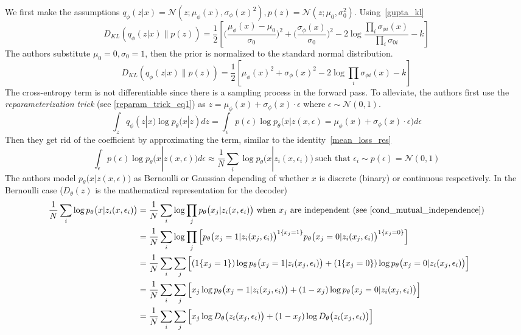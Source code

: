 \documentclass{book}
\numberwithin{equation}{subsection}
\begin{document}
We first make the assumptions $q_\phi(z|x)=\mathcal{N}(z;\mu_\phi(x),\sigma_\phi(x)^2), p(z)=\mathcal{N}(z;\mu_0,\sigma_0^2)$. Using~\ref{gupta_kl}
\begin{equation}
    D_{KL}(q_\phi(z|x) \parallel p(z)) = \frac{1}{2}\left[\Big(\frac{\mu_\phi(x)-\mu_0}{\sigma_0}\Big)^2+\Big(\frac{\sigma_\phi(x)}{\sigma_0}\Big)^2-2\log\frac{\prod_i\sigma_{\phi i}(x)}{\prod_i\sigma_{0i}} - k\right]
\end{equation}
The authors substitute $\mu_0=0,\sigma_0=1$, then the prior is normalized to the standard normal distribution.
\begin{equation}
    D_{KL}(q_\phi(z|x) \parallel p(z)) = \frac{1}{2}\left[\mu_\phi(x)^2+\sigma_\phi(x)^2-2\log\prod_i\sigma_{\phi i}(x) - k\right]
\end{equation}
The cross-entropy term is not differentiable since there is a sampling process in the forward pass. To alleviate, the authors first use the \textit{reparameterization trick} (see \ref{reparam_trick_eq1}) as $z = \mu_\phi(x)+\sigma_\phi(x) \cdot \epsilon$ where $\epsilon \sim \mathcal{N}(0,1)$.
\begin{equation}
    \int_z q_\phi(z|x)\log p_\theta(x|z)dz = \int_\epsilon p(\epsilon)\log p_\theta \big(x|z(x, \epsilon) = \mu_\phi(x)+\sigma_\phi(x) \cdot \epsilon \big)d\epsilon
\end{equation}
Then they get rid of the coefficient by approximating the term, similar to the identity~\ref{mean_loss_res}
\begin{equation}
    \int_\epsilon p(\epsilon)\log p_\theta \big(x|z(x, \epsilon) \big)d\epsilon \approx \frac{1}{N}\sum_i \log p_\theta \big(x|z_i(x, \epsilon_i) \big)\ \text{such that $\epsilon_i \sim p(\epsilon) = \mathcal{N}(0,1)$}
\end{equation}
The authors model $p_\theta \big(x|z(x, \epsilon) \big)$ as Bernoulli or Gaussian depending of whether $x$ is discrete (binary) or continuous respectively. In the Bernoulli case ($D_\theta(z)$ is the mathematical representation for the decoder)
\begin{align}
    \frac{1}{N}\sum_i \log p_\theta \big(x|z_i(x, \epsilon_i) \big)
    &= \frac{1}{N}\sum_i \log \prod_j p_\theta \big(x_j|z_i(x, \epsilon_i) \big)\ \text{when $x_j$ are independent (see~\ref{cond_mutual_independence})}\\
    &= \frac{1}{N}\sum_i \log\prod_j\left[p_\theta \big(x_j=1|z_i(x_j, \epsilon_i) \big)^{1\{x_j=1\}}p_\theta \big(x_j=0|z_i(x_j, \epsilon_i) \big)^{1\{x_j=0\}}\right]\\
    &= \frac{1}{N}\sum_i \sum_j\Big[(1\{x_j=1\})\log p_\theta \big(x_j=1|z_i(x_j, \epsilon_i) \big)+(1\{x_j=0\})\log p_\theta \big(x_j=0|z_i(x_j, \epsilon_i)\big)\Big]\\
    &= \frac{1}{N}\sum_i \sum_j\Big[x_j\log p_\theta \big(x_j=1|z_i(x_j, \epsilon_i) \big)+(1-x_j)\log p_\theta \big(x_j=0|z_i(x_j, \epsilon_i)\big)\Big]\\
    &= \frac{1}{N}\sum_i \sum_j\Big[x_j\log D_\theta\big(z_i(x_j, \epsilon_i) \big)+(1-x_j)\log D_\theta\big(z_i(x_j, \epsilon_i)\big)\Big]
\end{align}
\end{document}
